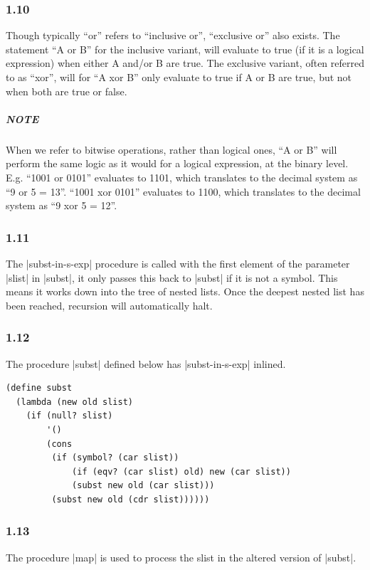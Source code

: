 \documentclass[a4paper]{article}
\begin{document}
\subsubsection*{1.10}

Though typically ``or'' refers to ``inclusive or'', ``exclusive or'' also exists. The statement ``A or B'' for the inclusive variant, will evaluate to true (if it is a logical expression) when either A and/or B are true. The exclusive variant, often referred to as ``xor'', will for ``A xor B'' only evaluate to true if A or B are true, but not when both are true or false.

\subparagraph{NOTE} When we refer to bitwise operations, rather than logical ones, ``A or B'' will perform the same logic as it would for a logical expression, at the binary level. E.g. ``1001 or 0101'' evaluates to 1101, which translates to the decimal system as ``9 or 5 = 13''. ``1001 xor 0101'' evaluates to 1100, which translates to the decimal system as ``9 xor 5 = 12''.

\subsubsection*{1.11}

The |subst-in-s-exp| procedure is called with the first element of the parameter |slist| in |subst|, it only passes this back to |subst| if it is not a symbol. This means it works down into the tree of nested lists. Once the deepest nested list has been reached, recursion will automatically halt.

\subsubsection*{1.12}

The procedure |subst| defined below has |subst-in-s-exp| inlined.

\begin{lstlisting}
(define subst
  (lambda (new old slist)
    (if (null? slist)
        '()
        (cons
         (if (symbol? (car slist))
             (if (eqv? (car slist) old) new (car slist))
             (subst new old (car slist)))
         (subst new old (cdr slist))))))
\end{lstlisting}

\subsubsection*{1.13}

The procedure |map| is used to process the slist in the altered version of |subst|.
\end{document}
